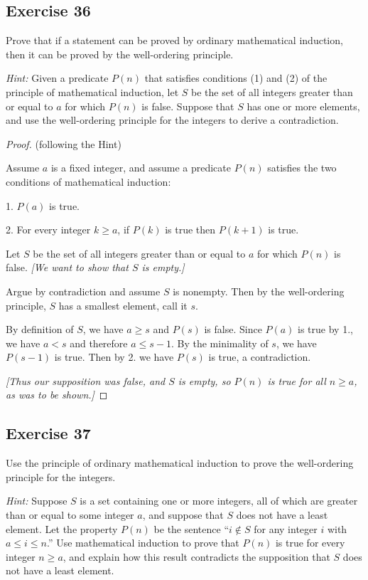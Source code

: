 \documentclass[14pt]{extarticle}
\begin{document}
\subsection{Exercise 36}
Prove that if a statement can be proved by ordinary mathematical induction, then it can be proved by the well-ordering principle.

    {\it Hint:} Given a predicate $P(n)$ that satisfies conditions (1) and (2) of the principle of mathematical
induction, let $S$ be the set of all integers greater than or equal to $a$ for which $P(n)$ is false. Suppose that $S$
has one or more elements, and use the well-ordering principle for the integers to derive a contradiction.

\begin{proof}
    (following the Hint)

    Assume $a$ is a fixed integer, and assume a predicate $P(n)$ satisfies the two conditions of mathematical induction:

    1. $P(a)$ is true.

    2. For every integer $k \geq a$, if $P(k)$ is true then $P(k+1)$ is true.

    Let $S$ be the set of all integers greater than or equal to $a$ for which $P(n)$ is false.
        {\it [We want to show that $S$ is empty.]}

    Argue by contradiction and assume $S$ is nonempty.
    Then by the well-ordering principle, $S$ has a smallest element, call it $s$.

    By definition of $S$, we have $a \geq s$ and $P(s)$ is false. Since $P(a)$ is true by 1., we have $a < s$ and
    therefore $a \leq s-1$.
    By the minimality of $s$, we have $P(s-1)$ is true.
    Then by 2. we have $P(s)$ is true, a contradiction.

        {\it [Thus our supposition was false, and $S$ is empty, so $P(n)$ is true for all $n \geq a$, as was to be shown.]}
\end{proof}

\subsection{Exercise 37}
Use the principle of ordinary mathematical induction to prove the well-ordering principle for the integers.

    {\it Hint:} Suppose $S$ is a set containing one or more integers, all of which are greater than or equal to some
integer $a$, and suppose that $S$ does not have a least element. Let the property $P(n)$ be the sentence
``$i \notin S$ for any integer $i$ with $a \leq i \leq n$.'' Use mathematical induction to prove that $P(n)$ is
true for every integer $n \geq a$, and explain how this result contradicts the supposition that
$S$ does not have a least element.
\end{document}
